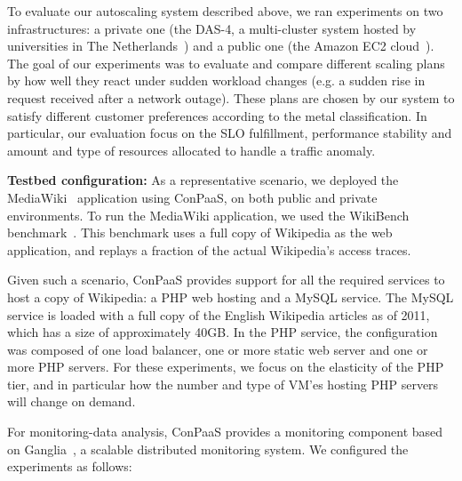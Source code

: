 
To evaluate our autoscaling system described above, we ran experiments
on two infrastructures: a private one (the DAS-4, a multi-cluster system
hosted by universities in The Netherlands~\cite{das4}) and a public
one (the Amazon EC2 cloud~\cite{amazonEC2}). The goal of our experiments
was to evaluate and compare different scaling plans by how well they react under sudden
workload changes (e.g. a sudden rise in request received after a network outage). These plans are chosen by our system to satisfy different customer preferences according to the metal classification. In particular, our evaluation focus on
the SLO fulfillment, performance stability and amount and type of resources allocated to handle
a traffic anomaly. 



\textbf{Testbed configuration:}  As a representative scenario, we deployed the MediaWiki~\cite{mediawiki} application using ConPaaS, on both public and private environments. To run the MediaWiki application, we used the WikiBench benchmark~\cite{wikibench}. This benchmark uses a full copy of Wikipedia as the web application, and replays a fraction of the actual Wikipedia's access traces. 

Given such a scenario, ConPaaS provides support for all the required services to host a copy of Wikipedia: a PHP web hosting and a MySQL service. The MySQL service is loaded with a full copy of the English Wikipedia articles as of 2011, which has a size of approximately 40GB.  In the PHP service, the configuration was composed of one load balancer, one or more static web server and one or more PHP servers. For these experiments, we focus on the elasticity of the PHP tier, and in particular how the number and type of VM'es hosting PHP servers will change on demand.

For monitoring-data analysis, ConPaaS provides a monitoring component based on Ganglia~\cite{ganglia}, a scalable distributed monitoring system. We configured the experiments as follows:

